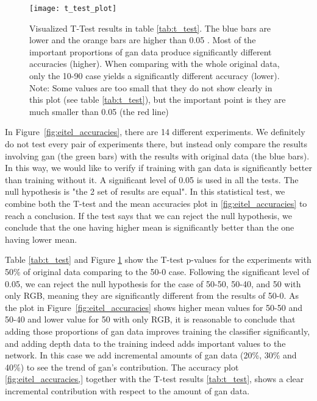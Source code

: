 \begin{figure}[h!]
	\centering
	\texttt{[image: t\_test\_plot]}
	\caption{Visualized T-Test results in table \ref{tab:t_test}. The blue bars are lower
	and the orange bars are higher than 0.05 . Most of the important
	proportions of \acrshort{gan} data produce significantly different accuracies (higher).
	When comparing with the whole original data, only the 10-90 case yields a significantly
different accuracy (lower). Note: Some values are too small that they do not show clearly
in this plot (see table \ref{tab:t_test}), but the important point is they are much
smaller than 0.05 (the red line)}
\label{fig:t_test_plot}
\end{figure}

In Figure~\ref{fig:eitel_accuracies}, there are 14 different experiments. We definitely do
not test every pair of experiments there, but instead only compare the results involving
\acrshort{gan} (the green bars) with the results with original data (the blue bars). In
this way, we would like to verify if training with \acrshort{gan} data is significantly
better than training without it. A significant level of 0.05 is used in all the tests. The
null hypothesis is "the 2 set of results are equal". In this statistical test, we combine
both the T-test and the mean accuracies plot in \ref{fig:eitel_accuracies} to reach a  
conclusion. If the test says that we can reject the null hypothesis, we conclude that the
one having higher mean is significantly better than the one having lower mean.

Table \ref{tab:t_test} and Figure \ref{fig:t_test_plot} show the T-test p-values for the
experiments with 50\% of original data comparing to the 50-0 case. Following the
significant level of 0.05, we can reject the null hypothesis for the case of 50-50, 50-40,
and 50 with only RGB, meaning they are significantly different from the results of 50-0.
As the plot in Figure~\ref{fig:eitel_accuracies} shows higher mean values for 50-50 and
50-40 and lower value for 50 with only RGB, it is reasonable to conclude that adding those
proportions of \acrshort{gan} data improves training the classifier significantly, and
adding depth data to the training indeed adds important values to the network. In this
case we add incremental amounts of \acrshort{gan} data (20\%, 30\% and 40\%) to see the
trend of \acrshort{gan}'s contribution. The accuracy plot \ref{fig:eitel_accuracies,}
together with the T-test results \ref{tab:t_test}, shows a clear incremental contribution
with respect to the amount of \acrshort{gan} data.

